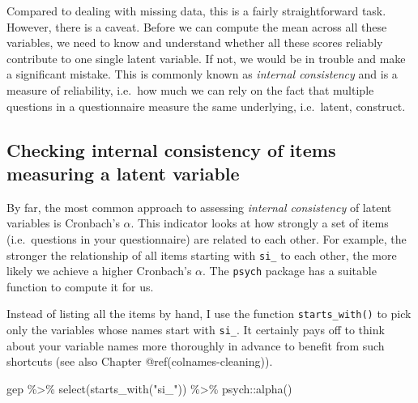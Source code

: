 \documentclass[
  letterpaper,
]{krantz}
\makeatletter
\newenvironment{Shaded}{\begin{snugshade}}{\end{snugshade}}
\newcommand{\FunctionTok}[1]{\textcolor[rgb]{0.28,0.35,0.67}{#1}}
\newcommand{\NormalTok}[1]{\textcolor[rgb]{0.00,0.23,0.31}{#1}}
\newcommand{\SpecialCharTok}[1]{\textcolor[rgb]{0.37,0.37,0.37}{#1}}
\newcommand{\StringTok}[1]{\textcolor[rgb]{0.13,0.47,0.30}{#1}}
\newenvironment{kframe}{%
\medskip{}
\setlength{\fboxsep}{.8em}
 \def\at@end@of@kframe{}%
 \ifinner\ifhmode%
  \def\at@end@of@kframe{\end{minipage}}%
  \begin{minipage}{\columnwidth}%
 \fi\fi%
 \def\FrameCommand##1{\hskip\@totalleftmargin \hskip-\fboxsep
 \colorbox{shadecolor}{##1}\hskip-\fboxsep
     \hskip-\linewidth \hskip-\@totalleftmargin \hskip\columnwidth}%
 \MakeFramed {\advance\hsize-\width
   \@totalleftmargin\z@ \linewidth\hsize
   \@setminipage}}%
 {\par\unskip\endMakeFramed%
 \at@end@of@kframe}
\renewenvironment{Shaded}{\begin{kframe}}{\end{kframe}}
\makeatother
\begin{document}
Compared to dealing with missing data, this is a fairly straightforward
task. However, there is a caveat. Before we can compute the mean across
all these variables, we need to know and understand whether all these
scores reliably contribute to one single latent variable. If not, we
would be in trouble and make a significant mistake. This is commonly
known as \emph{internal consistency} and is a measure of reliability,
i.e.~how much we can rely on the fact that multiple questions in a
questionnaire measure the same underlying, i.e.~latent, construct.

\subsection{Checking internal consistency of items measuring a latent
variable}\label{internal-consistency}

By far, the most common approach to assessing \emph{internal
consistency} of latent variables is Cronbach's \(\alpha\). This
indicator looks at how strongly a set of items (i.e.~questions in your
questionnaire) are related to each other. For example, the stronger the
relationship of all items starting with \texttt{si\_} to each other, the
more likely we achieve a higher Cronbach's \(\alpha\). The
\texttt{psych} package has a suitable function to compute it for us.

Instead of listing all the items by hand, I use the function
\texttt{starts\_with()} to pick only the variables whose names start
with \texttt{si\_}. It certainly pays off to think about your variable
names more thoroughly in advance to benefit from such shortcuts (see
also Chapter @ref(colnames-cleaning)).

\begin{Shaded}
\begin{Highlighting}[]
\NormalTok{gep }\SpecialCharTok{\%\textgreater{}\%}
  \FunctionTok{select}\NormalTok{(}\FunctionTok{starts\_with}\NormalTok{(}\StringTok{"si\_"}\NormalTok{)) }\SpecialCharTok{\%\textgreater{}\%}
\NormalTok{  psych}\SpecialCharTok{::}\FunctionTok{alpha}\NormalTok{()}
\end{Highlighting}
\end{Shaded}
\end{document}
